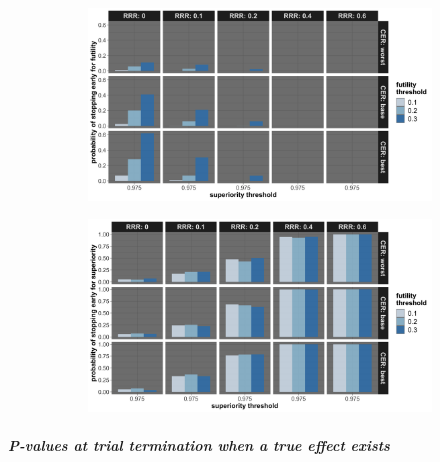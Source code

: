 \documentclass[]{article}
\let\oldsubparagraph\subparagraph
\renewcommand{\subparagraph}[1]{\oldsubparagraph{#1}\mbox{}}
\begin{document}
\begin{figure}
\centering
  \caption{Probability of stopping early due to futility, and stopping early due to superiority. Stopping probabilities
  are presented for the three control event rates (CER – rows), relative risk reductions (RRR – columns), and futility thresholds (x-axis).}
  \label{fig:fig}
  \begin{subfigure}{0.8\textwidth}
    \centering
    \caption{}
    \includegraphics{../p1_plots/batch_size_nb_3000/prob_stop_early_fut_p1.png}
  \end{subfigure}
  \begin{subfigure}{0.8\textwidth}
    \centering
    \caption{}
    \includegraphics{../p1_plots/batch_size_nb_3000/prob_stop_early_sup_p1.png}
  \end{subfigure}
\end{figure}

\clearpage

\hypertarget{p-values-at-trial-termination-when-a-true-effect-exists-2}{%
\subparagraph{P-values at trial termination when a true effect
exists}\label{p-values-at-trial-termination-when-a-true-effect-exists-2}}
\end{document}
